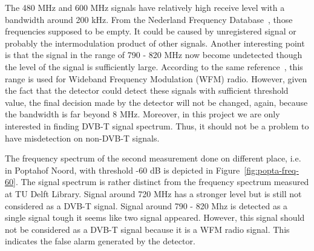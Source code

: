 The 480 MHz and 600 MHz signals have relatively high receive level with a bandwidth around 200 kHz. From the Nederland Frequency Database~\cite{robertelsinga2016}, those frequencies supposed to be empty. It could be caused by unregistered signal or probably the intermodulation product of other signals. Another interesting point is that the signal in the range of 790 - 820 MHz now become undetected though the level of the signal is sufficiently large. According to the same reference~\cite{robertelsinga2016}, this range is used for Wideband Frequency Modulation (WFM) radio. However, given the fact that the detector could detect these signals with sufficient threshold value, the final decision made by the detector will not be changed, again, because the bandwidth is far beyond 8 MHz. Moreover, in this project we are only interested in finding DVB-T signal spectrum. Thus, it should not be a problem to have misdetection on non-DVB-T signals.

The frequency spectrum of the second measurement done on different place, i.e. in Poptahof Noord, with threshold -60 dB is depicted in Figure~\ref{fig:popta-freq-60}. The signal spectrum is rather distinct from the frequency spectrum measured at TU Delft Library. Signal around 720 MHz has a stronger level but is still not considered as a DVB-T signal. Signal around 790 - 820 Mhz is detected as a single signal tough it seems like two signal appeared. However, this signal should not be considered as a DVB-T signal because it is a WFM radio signal. This indicates the false alarm generated by the detector.

